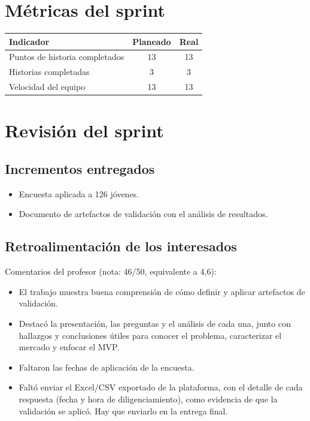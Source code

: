\documentclass[11pt,a4paper]{article}
\begin{document}
\section{Métricas del sprint}

\begin{tabularx}{\textwidth}{X c c}
  \toprule
  \textbf{Indicador} & \textbf{Planeado} & \textbf{Real} \\
  \midrule
  Puntos de historia completados & 13 & 13 \\
  Historias completadas          & 3 & 3 \\
  Velocidad del equipo           & 13 & 13 \\
  \bottomrule
\end{tabularx}

\section{Revisión del sprint}

\subsection{Incrementos entregados}
\begin{itemize}[leftmargin=1.5em]
  \item {Encuesta aplicada a 126 jóvenes.}
  \item {Documento de artefactos de validación con el análisis de resultados.}
\end{itemize}

\subsection{Retroalimentación de los interesados}
{Comentarios del profesor (nota: 46/50, equivalente a 4,6):}
\begin{itemize}[leftmargin=1.5em]
  \item {El trabajo muestra buena comprensión de cómo definir y aplicar artefactos de validación.}
  \item {Destacó la presentación, las preguntas y el análisis de cada una, junto con hallazgos y conclusiones útiles para conocer el problema, caracterizar el mercado y enfocar el MVP.}
  \item {Faltaron las fechas de aplicación de la encuesta.}
  \item {Faltó enviar el Excel/CSV exportado de la plataforma, con el detalle de cada respuesta (fecha y hora de diligenciamiento), como evidencia de que la validación se aplicó. Hay que enviarlo en la entrega final.}
\end{itemize}
\end{document}
